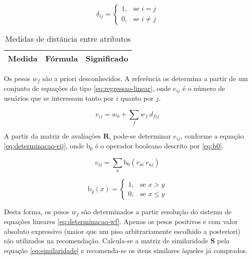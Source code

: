 \begin{equation}
\label{eq:delta}
\delta_{ij} = 
\begin{cases}
1, &\text{se }i=j \\
0, &\text{se }i \neq j
\end{cases} 
\end{equation}

\begin{table}[hp]
\begin{center}
    \caption{Medidas de distância entre atributos}
    \label{tab:medidas-distancia}
    \begin{tabular}{ | l | c | p{5cm} | }
    \hline
    \textbf{Medida} & \textbf{Fórmula} & \textbf{Significado} \\ \hline
    \end{tabular}
\end{center}
\end{table}
 
Os pesos $w_f$ são a priori desconhecidos. A referência \cite{symeonidis2007feature} os determina a partir de um conjunto de equações do tipo \ref{eq:regressao-linear}, onde $e_{ij}$ é o número de usuários que se interessam tanto por $i$ quanto por $j$. 

\begin{equation}
\label{eq:regressao-linear} 
    e_{ij} = w_0 + \sum_{f}{w_{f} ~ d_{fij}}
\end{equation} 

A partir da matriz de avaliações $\mathbf{R}$, pode-se determinar $e_{ij}$, conforme a equação \ref{eq:determinacao-eij}, onde $\mathrm{b_0}$ é o operador booleano descrito por \ref{eq:b0}.

\begin{equation}
\label{eq:determinacao-eij} 
    e_{ij} = \sum_{u}{\mathrm{b_0}\left(r_{ui} ~ r_{uj}\right)}
\end{equation} 

\begin{equation}
\label{eq:b0}
\mathrm{b}_y\left(x\right) = 
\begin{cases}
1, &\text{se }x>y \\
0, &\text{se }x\leq y
\end{cases} 
\end{equation}

Desta forma, os pesos $w_f$ são determinados a partir resolução do sistema de equações lineares \ref{eq:determinacao-wf}. Apenas os pesos positivos e com valor absoluto expressivo (maior que um piso arbitrariamente escolhido a posteriori) são utilizados na recomendação. Calcula-se a matriz de similaridade $\mathbf{S}$ pela equação \ref{eq:similaridade} e recomenda-se os itens similares àqueles já comprados.  

